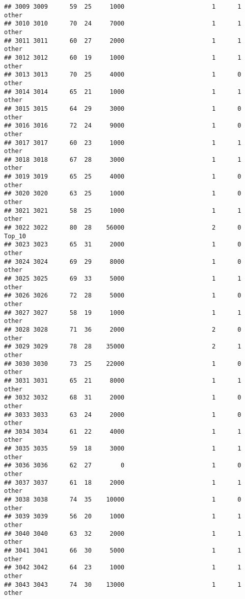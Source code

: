 \documentclass[
]{article}
\begin{document}
\begin{verbatim}
## 3009 3009      59  25     1000                        1      1    other
## 3010 3010      70  24     7000                        1      1    other
## 3011 3011      60  27     2000                        1      1    other
## 3012 3012      60  19     1000                        1      1    other
## 3013 3013      70  25     4000                        1      0    other
## 3014 3014      65  21     1000                        1      1    other
## 3015 3015      64  29     3000                        1      0    other
## 3016 3016      72  24     9000                        1      0    other
## 3017 3017      60  23     1000                        1      1    other
## 3018 3018      67  28     3000                        1      1    other
## 3019 3019      65  25     4000                        1      0    other
## 3020 3020      63  25     1000                        1      0    other
## 3021 3021      58  25     1000                        1      1    other
## 3022 3022      80  28    56000                        2      0   Top_10
## 3023 3023      65  31     2000                        1      0    other
## 3024 3024      69  29     8000                        1      0    other
## 3025 3025      69  33     5000                        1      1    other
## 3026 3026      72  28     5000                        1      0    other
## 3027 3027      58  19     1000                        1      1    other
## 3028 3028      71  36     2000                        2      0    other
## 3029 3029      78  28    35000                        2      1    other
## 3030 3030      73  25    22000                        1      0    other
## 3031 3031      65  21     8000                        1      1    other
## 3032 3032      68  31     2000                        1      0    other
## 3033 3033      63  24     2000                        1      0    other
## 3034 3034      61  22     4000                        1      1    other
## 3035 3035      59  18     3000                        1      1    other
## 3036 3036      62  27        0                        1      0    other
## 3037 3037      61  18     2000                        1      1    other
## 3038 3038      74  35    10000                        1      0    other
## 3039 3039      56  20     1000                        1      1    other
## 3040 3040      63  32     2000                        1      1    other
## 3041 3041      66  30     5000                        1      1    other
## 3042 3042      64  23     1000                        1      1    other
## 3043 3043      74  30    13000                        1      1    other

\end{verbatim}
\end{document}
